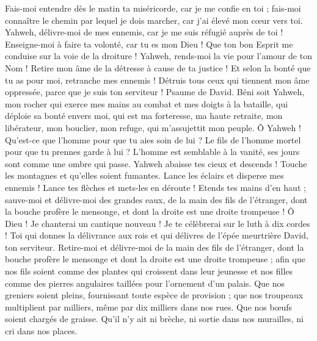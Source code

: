 \begin{multicols}{2}
Fais-moi entendre dès le matin ta miséricorde, car je me confie en toi ; fais-moi connaître le chemin par lequel je dois marcher, car j'ai élevé mon cœur vers toi.
Yahweh, délivre-moi de mes ennemis, car je me suis réfugié auprès de toi !
Enseigne-moi à faire ta volonté, car tu es mon Dieu ! Que ton bon Esprit me conduise sur la voie de la droiture !
Yahweh, rends-moi la vie pour l'amour de ton Nom ! Retire mon âme de la détresse à cause de ta justice !
Et selon la bonté que tu as pour moi, retranche mes ennemis ! Détruis tous ceux qui tiennent mon âme oppressée, parce que je suis ton serviteur !
\VerseOne{}Psaume de David. Béni soit Yahweh, mon rocher qui exerce mes mains au combat et mes doigts à la bataille,
qui déploie sa bonté envers moi, qui est ma forteresse, ma haute retraite, mon libérateur, mon bouclier, mon refuge, qui m'assujettit mon peuple.
Ô Yahweh ! Qu'est-ce que l'homme pour que tu aies soin de lui ? Le fils de l'homme mortel pour que tu prennes garde à lui ?
L'homme est semblable à la vanité, ses jours sont comme une ombre qui passe.
Yahweh abaisse tes cieux et descends ! Touche les montagnes et qu'elles soient fumantes.
Lance les éclairs et disperse mes ennemis ! Lance tes flèches et mets-les en déroute !
Etends tes mains d'en haut ; sauve-moi et délivre-moi des grandes eaux, de la main des fils de l'étranger,
dont la bouche profère le mensonge, et dont la droite est une droite trompeuse !
Ô Dieu ! Je chanterai un cantique nouveau ! Je te célèbrerai sur le luth à dix cordes !
Toi qui donnes la délivrance aux rois et qui délivres de l'épée meurtrière David, ton serviteur.
Retire-moi et délivre-moi de la main des fils de l'étranger, dont la bouche profère le mensonge et dont la droite est une droite trompeuse ;
afin que nos fils soient comme des plantes qui croissent dans leur jeunesse et nos filles comme des pierres angulaires taillées pour l'ornement d'un palais.
Que nos greniers soient pleins, fournissant toute espèce de provision ; que nos troupeaux multiplient par milliers, même par dix milliers dans nos rues.
Que nos bœufs soient chargés de graisse. Qu'il n'y ait ni brèche, ni sortie dans nos murailles, ni cri dans nos places.

\end{multicols}
